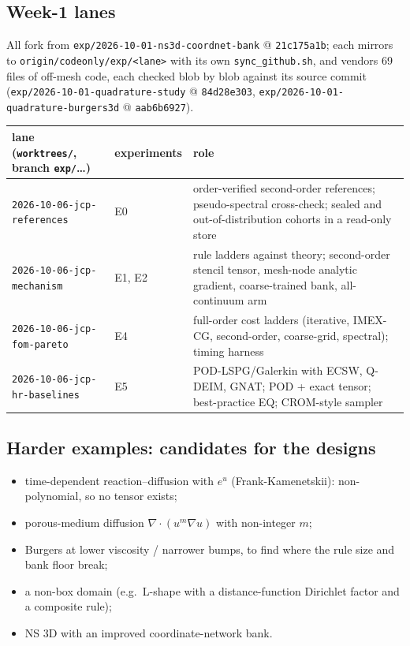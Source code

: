 \subsection*{Week-1 lanes}
All fork from \texttt{exp/2026-10-01-ns3d-coordnet-bank} @ \texttt{21c175a1b}; each mirrors to
\texttt{origin/codeonly/exp/<lane>} with its own \texttt{sync\_github.sh}, and vendors 69 files of off-mesh code, each checked blob by blob against its source commit
(\texttt{exp/2026-10-01-quadrature-study} @ \texttt{84d28e303}, \texttt{exp/2026-10-01-quadrature-burgers3d} @ \texttt{aab6b6927}).

\medskip
\begin{tabularx}{\linewidth}{@{}l l X@{}}
\toprule
lane (\texttt{worktrees/}, branch \texttt{exp/}\dots) & experiments & role\\
\midrule
\texttt{2026-10-06-jcp-references} & E0 & order-verified second-order references; pseudo-spectral cross-check; sealed and out-of-distribution cohorts in a read-only store\\
\texttt{2026-10-06-jcp-mechanism} & E1, E2 & rule ladders against theory; second-order stencil tensor, mesh-node analytic gradient, coarse-trained bank, all-continuum arm\\
\texttt{2026-10-06-jcp-fom-pareto} & E4 & full-order cost ladders (iterative, IMEX-CG, second-order, coarse-grid, spectral); timing harness\\
\texttt{2026-10-06-jcp-hr-baselines} & E5 & POD-LSPG/Galerkin with ECSW, Q-DEIM, GNAT; POD + exact tensor; best-practice EQ; CROM-style sampler\\
\bottomrule
\end{tabularx}

\subsection*{Harder examples: candidates for the designs}
\begin{itemize}
\item time-dependent reaction--diffusion with $e^u$ (Frank-Kamenetskii): non-polynomial, so no tensor exists;
\item porous-medium diffusion $\nabla\cdot(u^m\nabla u)$ with non-integer $m$;
\item Burgers at lower viscosity / narrower bumps, to find where the rule size and bank floor break;
\item a non-box domain (e.g.\ L-shape with a distance-function Dirichlet factor and a composite rule);
\item NS 3D with an improved coordinate-network bank.
\end{itemize}

